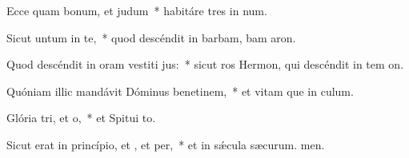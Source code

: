 \item Ecce quam bonum, et  judum~* habitáre tres in num.
\item Sicut untum in te,~* quod descéndit in barbam, bam aron.
\item Quod descéndit in oram vestiti jus:~* sicut ros Hermon, qui descéndit in tem on.
\item Quóniam illic mandávit Dóminus benetinem,~* et vitam que in culum.
\item Glória tri, et o,~* et Spitui to.
\item Sicut erat in princípio, et , et per,~* et in sǽcula sæcurum. men.
